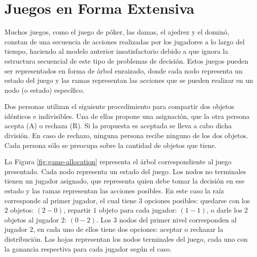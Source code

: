 \chapter{Juegos en Forma Extensiva}
\label{chapter:juegos-forma-extensiva}

Muchos juegos, como el juego de póker, las damas, el ajedrez y el dominó, constan de una secuencia de acciones realizadas por los jugadores a lo largo del tiempo, haciendo al modelo anterior insatisfactorio debido a que ignora la estructura secuencial de este tipo de problemas de decisión. Estos juegos pueden ser representados en forma de árbol enraizado, donde cada nodo representa un estado del juego y las ramas representan las acciones que se pueden realizar en un nodo (o estado) específico. 

\begin{example}
\label{ex:game-allocation}
Dos personas utilizan el siguiente procedimiento para compartir dos objetos idénticos e indivisibles. Una de ellas propone una asignación, que la otra persona acepta (A) o rechaza (R). Si la propuesta es aceptada se lleva a cabo dicha división. En caso de rechazo, ninguna persona recibe ninguno de los dos objetos. Cada persona sólo se preocupa sobre la cantidad de objetos que tiene. 
\end{example}

La Figura \ref{fig:game-allocation} representa el árbol correspondiente al juego presentado. Cada nodo representa un estado del juego. Los nodos no terminales tienen un jugador asignado, que representa quien debe tomar la decisión en ese estado y las ramas representan las acciones posibles. En este caso la raíz corresponde al primer jugador, el cual tiene $3$ opciones posibles: quedarse con los $2$ objetos: $(2-0)$, repartir $1$ objeto para cada jugador: $(1-1)$, o darle los $2$ objetos al jugador $2$: $(0-2)$. Los $3$ nodos del primer nivel corresponden al jugador $2$, en cada uno de ellos tiene dos opciones: aceptar o rechazar la distribución. Las hojas representan los nodos terminales del juego, cada uno con la ganancia respectiva para cada jugador según el caso.

